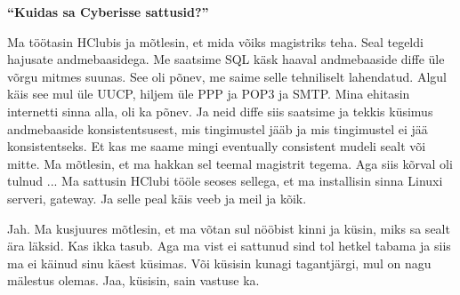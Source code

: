 \textbf{\enquote{Kuidas sa Cyberisse sattusid?}}

Ma töötasin HClubis ja mõtlesin, et mida võiks magistriks teha. Seal tegeldi hajusate andmebaasidega. Me saatsime SQL käsk haaval andmebaaside diffe üle võrgu mitmes suunas. See oli põnev, me saime selle tehniliselt lahendatud. Algul käis see mul üle UUCP, hiljem üle PPP ja POP3 ja SMTP. Mina ehitasin internetti sinna alla, oli ka põnev. Ja neid diffe siis saatsime ja tekkis küsimus andmebaaside konsistentsusest, mis tingimustel jääb ja mis tingimustel ei jää konsistentseks. Et kas me saame mingi eventually consistent mudeli sealt või mitte. Ma mõtlesin, et ma hakkan sel teemal magistrit tegema. Aga siis kõrval oli tulnud ... Ma sattusin HClubi tööle seoses sellega, et ma installisin sinna Linuxi serveri, gateway. Ja selle peal käis veeb ja meil ja kõik. 

Jah. Ma kusjuures mõtlesin, et ma võtan sul nööbist kinni ja küsin, miks sa sealt ära läksid. Kas ikka tasub. Aga ma vist ei sattunud sind tol hetkel tabama ja siis ma ei käinud sinu käest küsimas. Või küsisin kunagi tagantjärgi, mul on nagu mälestus olemas. Jaa, küsisin, sain vastuse ka. 

